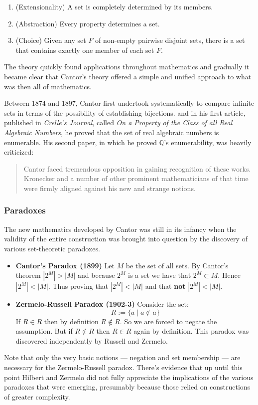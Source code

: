 \documentclass[12p]{article}
\theoremstyle{definition}
\begin{document}
\begin{enumerate}
	\item (Extensionality) A set is completely determined by its members.
	\item (Abstraction) Every property determines a set.
	\item (Choice) Given any set $F$ of non-empty pairwise disjoint sets, there is a set that contains exactly one member of each set $F$.
\end{enumerate}

The theory quickly found applications throughout mathematics and gradually it became clear that Cantor's theory offered a simple and unified approach to what was then all of mathematics.

Between 1874 and 1897, Cantor first undertook systematically to compare infinite sets in terms of the possibility of establishing bijections.\cite{kleene-meta} and in his first article, published in \textit{Crelle's Journal}, called \textit{On a Property of the Class of all Real Algebraic Numbers}, he proved that the set of real algebraic numbers is enumerable\cite{earlysettheory}. His second paper, in which he proved $\mathbb{Q}$'s enumerability, was heavily criticized:
\begin{quote}
	Cantor faced tremendous opposition in gaining recognition of these works. Kronecker and a number of other prominent mathematicians of that time were firmly aligned against his new and strange notions. \cite{earlysettheory}
\end{quote}

\subsubsection{Paradoxes}
The new mathematics developed by Cantor was still in its infancy when the validity of the entire construction was brought into question by the discovery of various set-theoretic paradoxes.
\begin{tcolorbox}[colback=white, arc=0.1pt]
	\begin{itemize}
	\item \textbf{Cantor's Paradox (1899)} \newline
	 Let $M$ be the set of all sets. By Cantor's theorem $|2^M| > |M|$ and because $2^M$ is a set we have that $2^M \subset M$. Hence $|2^M| < |M|$. Thus proving that $|2^M|  < |M|$ and that \textbf{not} $|2^M|  < |M|$.
	\item \textbf{Zermelo-Russell Paradox (1902-3)} \newline Consider the set: $$ R := \{a \mid a \notin a\}  $$ If $R\in R$ then by definition $R \notin R$. So we are forced to negate the assumption. But if $R \notin R$ then $R \in R$ again by definition. This paradox was discovered independently by Russell and Zermelo.
\end{itemize}
\end{tcolorbox}
Note that only the very basic notions --- negation and set membership --- are necessary for the Zermelo-Russell paradox. There's evidence that up until this point Hilbert and Zermelo did not fully appreciate the implications of the various paradoxes that were emerging\cite{sep-russell-paradox}, presumably because those relied on constructions of greater complexity.
\end{document}
